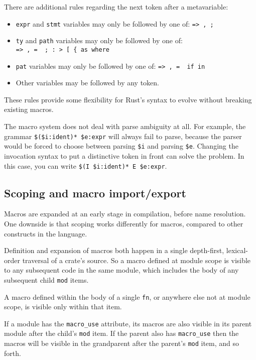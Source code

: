 \documentclass[a4paper,]{book}
\providecommand{\tightlist}{%
  \setlength{\itemsep}{0pt}\setlength{\parskip}{0pt}}
\begin{document}
There are additional rules regarding the next token after a
metavariable:

\begin{itemize}
\tightlist
\item
  \texttt{expr} and \texttt{stmt} variables may only be followed by one
  of: \texttt{=\textgreater{}\ ,\ ;}
\item
  \texttt{ty} and \texttt{path} variables may only be followed by one
  of:
  \texttt{=\textgreater{}\ ,\ =\ \textbar{}\ ;\ :\ \textgreater{}\ {[}\ \{\ as\ where}
\item
  \texttt{pat} variables may only be followed by one of:
  \texttt{=\textgreater{}\ ,\ =\ \textbar{}\ if\ in}
\item
  Other variables may be followed by any token.
\end{itemize}

These rules provide some flexibility for Rust's syntax to evolve without
breaking existing macros.

The macro system does not deal with parse ambiguity at all. For example,
the grammar \texttt{\$(\$i:ident)*\ \$e:expr} will always fail to parse,
because the parser would be forced to choose between parsing
\texttt{\$i} and parsing \texttt{\$e}. Changing the invocation syntax to
put a distinctive token in front can solve the problem. In this case,
you can write \texttt{\$(I\ \$i:ident)*\ E\ \$e:expr}.

\subsection{Scoping and macro
import/export}\label{scoping-and-macro-importexport}

Macros are expanded at an early stage in compilation, before name
resolution. One downside is that scoping works differently for macros,
compared to other constructs in the language.

Definition and expansion of macros both happen in a single depth-first,
lexical-order traversal of a crate's source. So a macro defined at
module scope is visible to any subsequent code in the same module, which
includes the body of any subsequent child \texttt{mod} items.

A macro defined within the body of a single \texttt{fn}, or anywhere
else not at module scope, is visible only within that item.

If a module has the \texttt{macro\_use} attribute, its macros are also
visible in its parent module after the child's \texttt{mod} item. If the
parent also has \texttt{macro\_use} then the macros will be visible in
the grandparent after the parent's \texttt{mod} item, and so forth.
\end{document}
